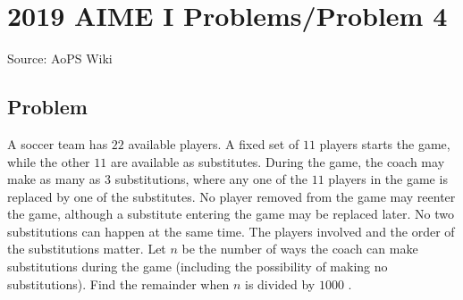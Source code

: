 \documentclass[12pt]{article}
\begin{document}
\section*{{2019 AIME I Problems/Problem 4}}
Source: AoPS Wiki

\subsection*{Problem}
A soccer team has $22$ available players. A fixed set of $11$ players starts the game, while the other $11$ are available as substitutes. During the game, the coach may make as many as $3$ substitutions, where any one of the $11$ players in the game is replaced by one of the substitutes. No player removed from the game may reenter the game, although a substitute entering the game may be replaced later. No two substitutions can happen at the same time. The players involved and the order of the substitutions matter. Let $n$ be the number of ways the coach can make substitutions during the game (including the possibility of making no substitutions). Find the remainder when $n$ is divided by $1000$ .
\end{document}
